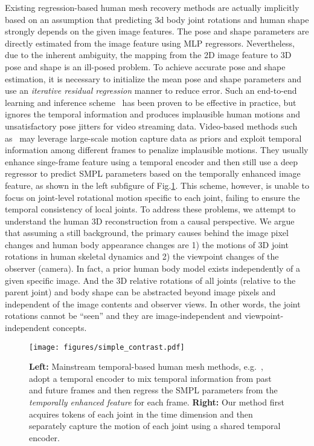 Existing regression-based human mesh recovery methods are actually implicitly based on an assumption that predicting 3d body joint rotations and human shape strongly depends on the given image features. 
The pose and shape parameters are directly estimated from the image feature using MLP regressors. 
Nevertheless, due to the inherent ambiguity, the mapping from the 2D image feature to 3D pose and shape is an ill-posed problem.
To achieve accurate pose and shape estimation, it is necessary to initialize the mean pose and shape parameters and use an \textit{iterative residual regression} manner to reduce error. 
Such an end-to-end learning and inference scheme~\citep{hmr:kanazawa2018end} has been proven to be effective in practice, but ignores the temporal information and produces implausible human motions and unsatisfactory pose jitters for video streaming data. 
Video-based methods such as~\citep{hmmr:kanazawa2019learning,vibe:kocabas2020vibe, tcmr:choi2021beyond, mps-net:wei2022capturing} may leverage large-scale motion capture data as priors and exploit temporal information among different frames to penalize implausible motions. 
 They usually enhance singe-frame feature using a temporal encoder and then still use a deep regressor to predict SMPL parameters based on the temporally enhanced image feature,  as shown in the left subfigure of Fig.\ref{fig:temporal_contrast}. 
This scheme, however, is unable to focus on joint-level rotational motion specific to each joint, failing to ensure the temporal consistency of local joints. 
To address these problems, we attempt to understand the human 3D reconstruction from a causal perspective. 
We argue that assuming a still background, the primary causes behind the image pixel changes and human body appearance changes are 1) the motions of 3D joint rotations in human skeletal dynamics and 2) the viewpoint changes of the observer (camera). 
In fact, a prior human body model exists independently of a given specific image. And the 3D relative rotations of all joints (relative to the parent joint) and body shape can be abstracted beyond image pixels and independent of the image contents and observer views. In other words, the joint rotations cannot be ``seen'' and they are image-independent and viewpoint-independent concepts.  %

\begin{figure}
	\centering
	\texttt{[image: figures/simple\_contrast.pdf]}
	\caption{\textbf{Left:} Mainstream temporal-based human mesh methods, e.g.~\citep{hmmr:kanazawa2019learning,vibe:kocabas2020vibe, tcmr:choi2021beyond}, adopt a temporal encoder to mix temporal information from past and future frames and then regress the SMPL parameters from the \textit{temporally enhanced feature} for each frame. \textbf{Right:} Our method first acquires tokens of each joint in the time dimension and then separately capture the motion of each joint using a shared temporal encoder.
	}
	\label{fig:temporal_contrast}\vspace{-0.2in}
\end{figure}

